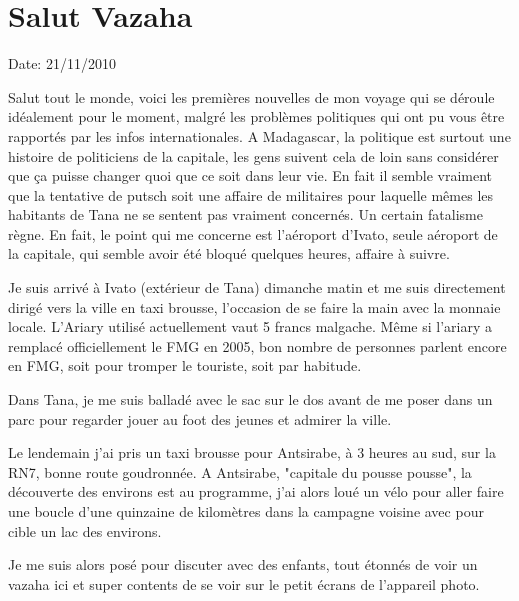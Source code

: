\section{Salut Vazaha}

Date: 21/11/2010

\begin{multicols}{2}

Salut tout le monde, voici les premières nouvelles de mon voyage qui se déroule idéalement pour le moment, malgré les problèmes politiques qui ont pu vous être rapportés par les infos internationales. A Madagascar, la politique est surtout une histoire de politiciens de la capitale, les gens suivent cela de loin sans considérer que ça puisse changer quoi que ce soit dans leur vie. En fait il semble vraiment que la tentative de putsch soit une affaire de militaires pour laquelle mêmes les habitants de Tana ne se sentent pas vraiment concernés. Un certain fatalisme règne. En fait, le point qui me concerne est l'aéroport d'Ivato, seule aéroport de la capitale, qui semble avoir été bloqué quelques heures, affaire à suivre.

Je suis arrivé à Ivato (extérieur de Tana) dimanche matin et me suis directement dirigé vers la ville en taxi brousse, l'occasion de se faire la main avec la monnaie locale. L'Ariary utilisé actuellement vaut 5 francs malgache. Même si l'ariary a remplacé officiellement le FMG en 2005, bon nombre de personnes parlent encore en FMG, soit pour tromper le touriste, soit par habitude.

Dans Tana, je me suis balladé avec le sac sur le dos avant de me poser dans un parc pour regarder jouer au foot des jeunes et admirer la ville.


Le lendemain j'ai pris un taxi brousse pour Antsirabe, à 3 heures au sud, sur la RN7, bonne route goudronnée. A Antsirabe, "capitale du pousse pousse", la découverte des environs est au programme, j'ai alors loué un vélo pour aller faire une boucle d'une quinzaine de kilomètres dans la campagne voisine avec pour cible un lac des environs.


Je me suis alors posé pour discuter avec des enfants, tout étonnés de voir un vazaha ici et super contents de se voir sur le petit écrans de l'appareil photo.


\end{multicols}
